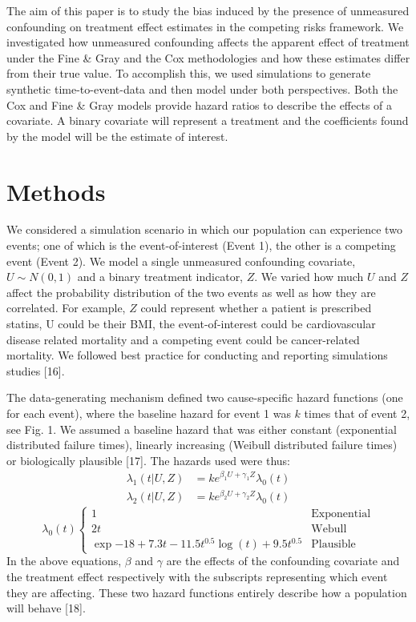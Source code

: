 \documentclass[12pt,PhD,twoside,openright]{muthesis}
\begin{document}
The aim of this paper is to study the bias induced by the presence of unmeasured confounding on treatment effect estimates in the competing risks framework. We investigated how unmeasured confounding affects the apparent effect of treatment under the Fine \& Gray and the Cox methodologies and how these estimates differ from their true value. To accomplish this, we used simulations to generate synthetic time-to-event-data and then model under both perspectives. Both the Cox and Fine \& Gray models provide hazard ratios to describe the effects of a covariate. A binary covariate will represent a treatment and the coefficients found by the model will be the estimate of interest.

\hypertarget{methods-2}{%
\section{Methods}\label{methods-2}}

We considered a simulation scenario in which our population can experience two events; one of which is the event-of-interest (Event 1), the other is a competing event (Event 2). We model a single unmeasured confounding covariate, \(U \sim N (0,1)\) and a binary treatment indicator, \(Z\). We varied how much \(U\) and \(Z\) affect the probability distribution of the two events as well as how they are correlated. For example, \(Z\) could represent whether a patient is prescribed statins, U could be their BMI, the event-of-interest could be cardiovascular disease related mortality and a competing event could be cancer-related mortality. We followed best practice for conducting and reporting simulations studies {[}16{]}.

The data-generating mechanism defined two cause-specific hazard functions (one for each event), where the baseline hazard for event 1 was \(k\) times that of event 2, see Fig. 1. We assumed a baseline hazard that was either constant (exponential distributed failure times), linearly increasing (Weibull distributed failure times) or biologically plausible {[}17{]}. The hazards used were thus:
\begin{align}
\lambda_1(t|U,Z) &= ke^{\beta_1U + \gamma_1Z}\lambda_0(t)\\
\lambda_2(t|U,Z) &= ke^{\beta_2U + \gamma_2Z}\lambda_0(t)
\end{align}
\begin{equation}
\lambda_0(t) \begin{cases}
1 & \textrm{Exponential}\\
2t & \textrm{Webull}\\
\exp{-18+7.3t-11.5t^{0.5}\log(t) + 9.5t^{0.5}} & \textrm{Plausible}
\end{cases}
\end{equation}
In the above equations, \(\beta\) and \(\gamma\) are the effects of the confounding covariate and the treatment effect respectively with the subscripts representing which event they are affecting. These two hazard functions entirely describe how a population will behave {[}18{]}.
\end{document}
